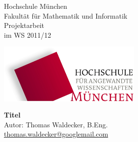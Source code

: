 %
\thispagestyle{plain}
\begin{minipage}[b]{0.6\textwidth} 
{\Large Hochschule München}\\
{\large Fakultät für Mathematik und Informatik}\\[5mm]
{\large Projektarbeit}\\
{\large im WS 2011/12}\\[5mm]
\end{minipage}
\hfill
\begin{minipage}[b]{0.4\textwidth}
	\includegraphics[width=70mm]{img/hm}
\end{minipage}

\begin{center}
  \vspace*{5mm} 
  {\huge \bfseries{Titel}} \\
  Autor: Thomas Waldecker, B.Eng.\\
  \href{mailto:thomas.waldecker@googlemail.com}{thomas.waldecker@googlemail.com}
\end{center}

